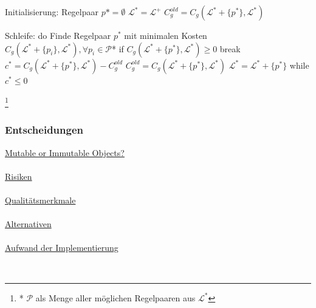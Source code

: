 \documentclass[11pt]{article}
\newcommand\blfootnote[1]{%
\begingroup
\renewcommand\thefootnote{}\footnote{#1}%
\addtocounter{footnote}{-1}%
\endgroup
}
\begin{document}
    \begin{algorithm}[caption={Generalisieren eines L-Systems mit Gewichtung $w_0$}, label={alg7}]
Initialisierung:
    Regelpaar $p* = \emptyset$
    $\mathcal{L}^* = \mathcal{L}^+$
    $C_g^{old} = C_g(\mathcal{L}^* + \{p^*\}, \mathcal{L}^*)$

Schleife:
do
    Finde Regelpaar $p^*$ mit minimalen Kosten $C_g(\mathcal{L}^* + \{p_i\}, \mathcal{L}^*), \forall p_i \in
\mathcal{P}$*
    if $C_g(\mathcal{L}^* + \{p^*\}, \mathcal{L}^*) \geq 0$
        break
    $c^* = C_g(\mathcal{L}^* + \{p^*\}, \mathcal{L}^*) - C_g^{old}$
    $C_g^{old} = C_g(\mathcal{L}^* + \{p^*\}, \mathcal{L}^*)$
    $\mathcal{L}^* = \mathcal{L}^* + \{p^*\}$
while $c^* \leq 0$
    \end{algorithm}
    \blfootnote{* $\mathcal{P}$ als Menge aller möglichen Regelpaaren aus $\mathcal{L}^*$}


    \subsubsection{Entscheidungen}
        \underline{Mutable or Immutable Objects?}\\~\\
        \underline{Risiken}\\~\\
        \underline{Qualitätsmerkmale}\\~\\
        \underline{Alternativen}\\~\\
        \underline{Aufwand der Implementierung}

    \newpage

    ~\nocite{*}
    \renewcommand{\refname}{Quellen}
    
    
\end{document}
